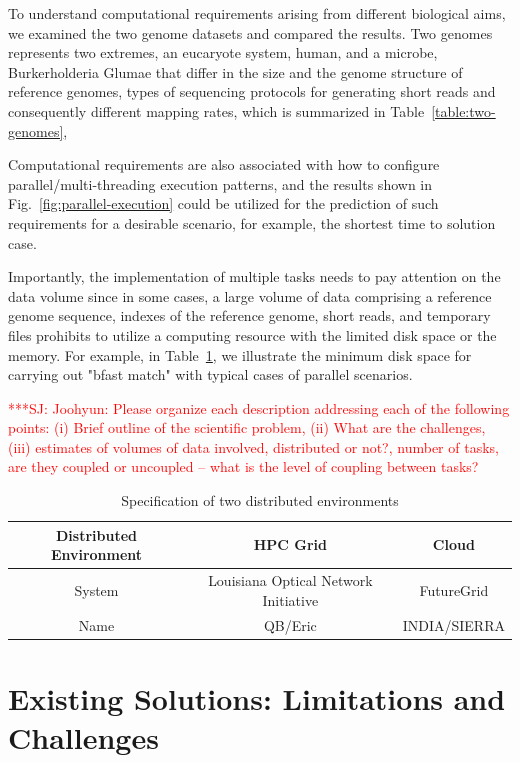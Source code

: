 \documentclass[12pt]{article}
\newcommand{\jhanote}[1]{ {\textcolor{red}     {***SJ: #1}}}
\newcommand{\jhanote}[1]{}
\begin{document}
To understand computational requirements arising from different biological aims, we examined the two genome datasets and compared the results. Two genomes represents two extremes, an eucaryote system, human, and a microbe, Burkerholderia Glumae\cite{kim2011} that differ in the size and the genome structure of reference genomes, types of sequencing protocols for generating short reads and consequently different mapping rates, which is summarized in Table~\ref{table:two-genomes}, 

Computational requirements are also associated with how to configure parallel/multi-threading execution patterns, and the results shown in Fig.~\ref{fig:parallel-execution} could be utilized for the prediction of such requirements for a desirable scenario, for example, the shortest time to solution case. 

Importantly, the implementation of multiple tasks needs to pay attention on the data volume since in some cases, a large volume of data comprising a reference genome sequence, indexes of the reference genome, short reads, and temporary files prohibits to utilize a computing resource with the limited disk space or the memory.  For example, in Table~\ref{}, we illustrate the minimum disk space for carrying out "bfast match" with typical cases of parallel scenarios.




\jhanote{Joohyun: Please organize each description addressing each of
  the following points: (i) Brief outline of the scientific problem,
  (ii) What are the challenges, (iii) estimates of volumes of data
  involved, distributed or not?, number of tasks, are they coupled or
  uncoupled -- what is the level of coupling between tasks?}


 \begin{table}
 \begin{tabular}{|c|cc|} 
 \hline 
Distributed Environment &  HPC Grid &  Cloud \\ \hline
System  &  Louisiana Optical Network Initiative & FutureGrid \\
Name &  QB/Eric   &  INDIA/SIERRA \\
 \hline
 \end{tabular}
\caption{Specification of two distributed environments}
\label{table:two-systems} 
\end{table}
 
 
\section{Existing Solutions: Limitations and Challenges}
\end{document}
